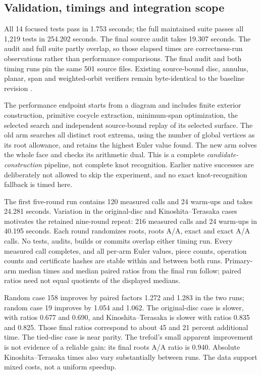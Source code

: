\subsection{Validation, timings and integration scope}

All 14 focused tests pass in 1.753 seconds; the full maintained suite passes
all 1,219 tests in 254.202 seconds. The final source audit takes 19.307
seconds. The audit and full suite partly overlap, so those elapsed times
are correctness-run observations rather than performance comparisons. The
final audit and both timing runs pin the same 501 source files. Existing
source-bound disc, annulus, planar, span and weighted-orbit verifiers remain
byte-identical to the baseline revision .

The performance endpoint starts from a diagram and includes finite exterior
construction, primitive cocycle extraction, minimum-span optimization, the
selected search and independent source-bound replay of its selected surface.
The old arm searches all distinct root extrema, using the number of global
vertices as its root allowance, and retains the highest Euler value found.
The new arm solves the whole face and checks its arithmetic dual. This is a
complete \emph{candidate-construction} pipeline, not complete knot
recognition. Earlier native successes are deliberately not allowed to skip
the experiment, and no exact knot-recognition fallback is timed here.

The first five-round run contains 120 measured calls and 24 warm-ups and
takes 24.281 seconds. Variation in the original-disc and Kinoshita--Terasaka
cases motivates the retained nine-round repeat: 216 measured calls and 24
warm-ups in 40.195 seconds. Each round randomizes roots, roots A/A, exact and
exact A/A calls. No tests, audits, builds or commits overlap either timing
run. Every measured call completes, and all per-arm Euler values, piece
counts, operation counts and certificate hashes are stable within and
between both runs. Primary-arm median times and median paired ratios from
the final run follow; paired ratios need not equal quotients of the displayed
medians.

\begin{center}
\small

\end{center}

Random case 158 improves by paired factors 1.272 and 1.283 in the two runs;
random case 19 improves by 1.054 and 1.062. The original-disc case is slower,
with ratios 0.677 and 0.690, and Kinoshita--Terasaka is slower with ratios
0.835 and 0.825. Those final ratios correspond to about 45 and 21 percent
additional time. The tied-disc case is near parity. The trefoil's small
apparent improvement is not evidence of a reliable gain: its final roots
A/A ratio is 0.940. Absolute Kinoshita--Terasaka times also vary substantially
between runs. The data support mixed costs, not a uniform speedup.

